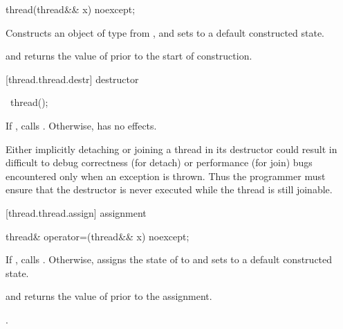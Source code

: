 %
\begin{itemdecl}
thread(thread&& x) noexcept;
\end{itemdecl}

\begin{itemdescr}
\pnum
\effects Constructs an object of type  from , and sets
 to a default constructed state.

\pnum
\postconditions {} and  returns the
value of  prior to the start of construction.

\end{itemdescr}

[thread.thread.destr]{ destructor}

%
\begin{itemdecl}
~thread();
\end{itemdecl}

\begin{itemdescr}
\pnum
If , calls . Otherwise, has no effects.
\begin{note} Either implicitly detaching or joining a  thread in its
destructor could result in difficult to debug correctness (for detach) or performance
(for join) bugs encountered only when an exception is thrown. Thus the programmer must
ensure that the destructor is never executed while the thread is still joinable.
\end{note}
\end{itemdescr}

[thread.thread.assign]{ assignment}

%
\begin{itemdecl}
thread& operator=(thread&& x) noexcept;
\end{itemdecl}

\begin{itemdescr}
\pnum
\effects If , calls . Otherwise, assigns the
state of  to  and sets  to a default constructed state.

\pnum
\postconditions {} and  returns the value of
 prior to the assignment.

\pnum
\returns {}.
\end{itemdescr}

